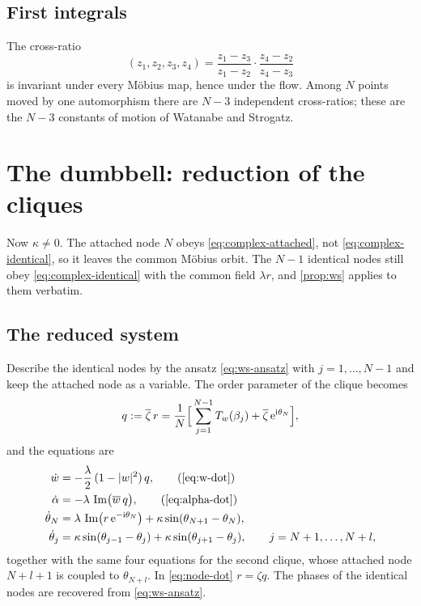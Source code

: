 \documentclass[a4paper,11pt]{article}
\newcommand{\conj}[1]{\overline{#1}}
\newcommand{\T}{T}                       %
\newcommand{\im}{\operatorname{Im}}
\newcommand{\e}{\mathrm{e}}
\newcommand{\ii}{\mathrm{i}}
\theoremstyle{remark}
\begin{document}
\subsection{First integrals}

The cross-ratio
\begin{equation}\label{eq:cross-ratio}
(z_1,z_2,z_3,z_4)=\frac{z_1-z_3}{z_1-z_2}\cdot\frac{z_4-z_2}{z_4-z_3}
\end{equation}
is invariant under every M\"obius map, hence under the flow. Among $N$ points
moved by one automorphism there are $N-3$ independent cross-ratios; these are
the $N-3$ constants of motion of Watanabe and Strogatz.

\section{The dumbbell: reduction of the cliques}\label{sec:reduction}

Now $\kappa\neq0$. The attached node $N$ obeys \eqref{eq:complex-attached}, not
\eqref{eq:complex-identical}, so it leaves the common M\"obius orbit. The
$N-1$ identical nodes still obey \eqref{eq:complex-identical} with the common
field $\lambda r$, and \cref{prop:ws} applies to them verbatim.

\subsection{The reduced system}

Describe the identical nodes by the ansatz \eqref{eq:ws-ansatz} with
$j=1,\dots,N-1$ and keep the attached node as a variable. The order parameter
of the clique becomes
\begin{equation}\label{eq:q-def}
q:=\conj\zeta\,r=\frac1N\Bigl[\,\sum_{j=1}^{N-1}\T_w(\beta_j)+\conj\zeta\,\e^{\ii\theta_N}\Bigr],
\end{equation}
and the equations are
\begin{align}
\dot w&=-\frac\lambda2\,(1-|w|^2)\,q,\tag{\ref{eq:w-dot}}\\
\dot\alpha&=-\lambda\,\im\bigl(\conj w\,q\bigr),\tag{\ref{eq:alpha-dot}}\\
\dot\theta_N&=\lambda\,\im\bigl(r\,\e^{-\ii\theta_N}\bigr)+\kappa\sin(\theta_{N+1}-\theta_N),
\label{eq:node-dot}\\
\dot\theta_j&=\kappa\sin(\theta_{j-1}-\theta_j)+\kappa\sin(\theta_{j+1}-\theta_j),
\qquad j=N+1,\dots,N+l,\label{eq:chain-dot}
\end{align}
together with the same four equations for the second clique, whose attached
node $N+l+1$ is coupled to $\theta_{N+l}$. In \eqref{eq:node-dot} $r=\zeta q$.
The phases of the identical nodes are recovered from \eqref{eq:ws-ansatz}.
\end{document}
